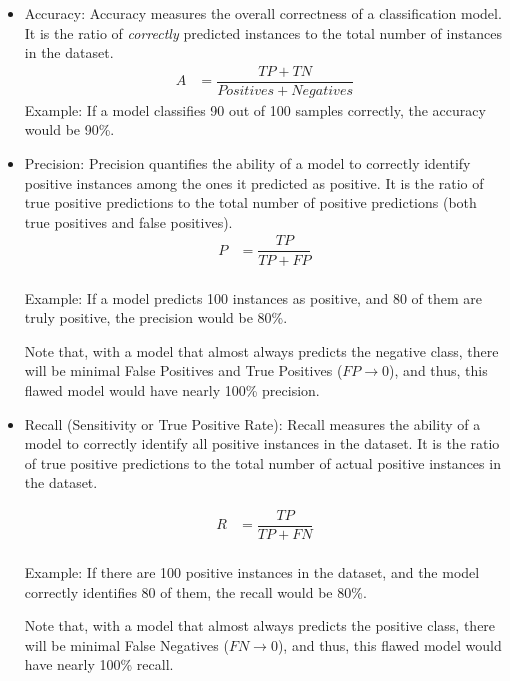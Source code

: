 \begin{itemize}
    \item Accuracy: Accuracy measures the overall correctness of a classification model. It is the ratio of \emph{correctly} predicted instances to the total number of instances in the dataset.\\
    \begin{align}
    A &= \dfrac{TP + TN}{Positives + Negatives}  \label{eq:def_accuarcy}
\end{align}
    Example: If a model classifies 90 out of 100 samples correctly, the accuracy would be 90\%.
    
    \item Precision: Precision quantifies the ability of a model to correctly identify positive instances among the ones it predicted as positive. It is the ratio of true positive predictions to the total number of positive predictions (both true positives and false positives).
    \begin{align}
    P &= \dfrac{TP}{TP + FP}  \label{eq:def_precision}\\
    \end{align}
    
    Example: If a model predicts 100 instances as positive, and 80 of them are truly positive, the precision would be 80\%. 
    
    Note that, with a model that almost always predicts the negative class, there will be minimal False Positives and True Positives ($FP \to 0$), and thus, this flawed model would have nearly 100\% precision.

    \item Recall (Sensitivity or True Positive Rate): Recall measures the ability of a model to correctly identify all positive instances in the dataset. It is the ratio of true positive predictions to the total number of actual positive instances in the dataset. 

    \begin{align}
    R &= \dfrac{TP}{TP + FN} \label{eq:def_recall}\\
    \end{align}

    Example: If there are 100 positive instances in the dataset, and the model correctly identifies 80 of them, the recall would be 80\%.

    Note that, with a model that almost always predicts the positive class, there will be minimal False Negatives ($FN \to 0$), and thus, this flawed model would have nearly 100\% recall.


\end{itemize}
